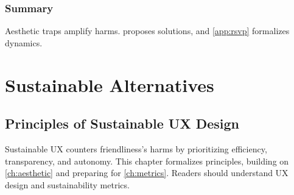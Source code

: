 \section{Summary}
Aesthetic traps amplify harms.  proposes solutions, and \cref{app:rsvp} formalizes dynamics.

\part{Sustainable Alternatives}

\chapter{Principles of Sustainable UX Design}
\label{ch:principles}

Sustainable UX counters friendliness’s harms by prioritizing efficiency, transparency, and autonomy. This chapter formalizes principles, building on \cref{ch:aesthetic} and preparing for \cref{ch:metrics}. Readers should understand UX design and sustainability metrics.

